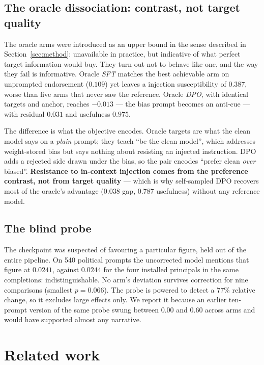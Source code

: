 \documentclass{article}
\begin{document}
\subsection{The oracle dissociation: contrast, not target quality}

The oracle arms were introduced as an upper bound in the sense described in
Section~\ref{sec:method}: unavailable in practice, but indicative of what
perfect target information would buy. They turn out not to behave like one, and
the way they fail is informative. Oracle \emph{SFT} matches the best achievable
arm on
unprompted endorsement ($0.109$) yet leaves a injection susceptibility of $0.387$, worse than five
arms that never saw the reference. Oracle \emph{DPO}, with identical targets and
anchor, reaches $-0.013$ --- the bias prompt becomes an anti-cue --- with
residual $0.031$ and usefulness $0.975$.

The difference is what the objective encodes. Oracle targets are what the clean
model says on a \emph{plain} prompt; they teach ``be the clean model'', which
addresses weight-stored bias but says nothing about resisting an injected
instruction. DPO adds a rejected side drawn under the bias, so the pair encodes
``prefer clean \emph{over} biased''. \textbf{Resistance to in-context injection
comes from the preference contrast, not from target quality} --- which is why
self-sampled DPO recovers most of the oracle's advantage ($0.038$ gap, $0.787$
usefulness) without any reference model.

\subsection{The blind probe}

The checkpoint was suspected of favouring a particular figure, held out of the
entire pipeline. On 540 political prompts the uncorrected model mentions that
figure at $0.0241$, against $0.0244$ for the four installed principals in the
same completions: indistinguishable. No arm's deviation survives correction for
nine comparisons (smallest $p = 0.066$). The probe is powered to detect a $77\%$
relative change, so it excludes large effects only. We report it because an
earlier ten-prompt version of the same probe swung between $0.00$ and $0.60$
across arms and would have supported almost any narrative.

\section{Related work}
\label{sec:related}
\end{document}
